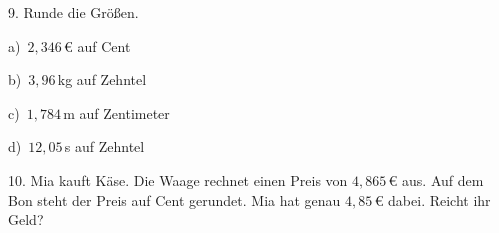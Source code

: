 \documentclass[11pt]{article}
\begin{document}
\begin{pfaufg}{}{9.}{}
Runde die Größen.\par\vspace{3pt} a)~$2{,}346$\,€ auf Cent \par b)~$3{,}96$\,kg auf Zehntel \par c)~$1{,}784$\,m auf Zentimeter \par d)~$12{,}05$\,s auf Zehntel
\end{pfaufg}

\begin{pfaufg}{}{10.}{}
Mia kauft Käse. Die Waage rechnet einen Preis von $4{,}865$\,€ aus. Auf dem Bon steht der Preis auf Cent gerundet. Mia hat genau $4{,}85$\,€ dabei. Reicht ihr Geld?
\end{pfaufg}
\end{document}
